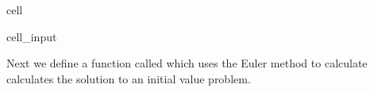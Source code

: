 \documentclass[letterpaper,10pt,english]{jupyterBook}
\begin{document}
\begin{sphinxuseclass}{cell}\begin{sphinxVerbatimInput}

\begin{sphinxuseclass}{cell_input}
\begin{sphinxVerbatim}[commandchars=\\\{\}]
   
   
\end{sphinxVerbatim}

\end{sphinxuseclass}\end{sphinxVerbatimInput}

\end{sphinxuseclass}
\sphinxAtStartPar
Next we define a function called  which uses the Euler method to calculate calculates the solution to an initial value problem.
\end{document}
